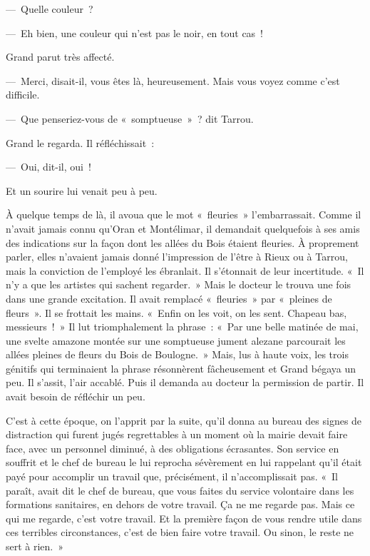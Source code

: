 \documentclass[french,twoside]{book} %
\begin{document}
— Quelle couleur ?\par
— Eh bien, une couleur qui n’est pas le noir, en tout cas !\par
Grand parut très affecté.\par
— Merci, disait-il, vous êtes là, heureusement. Mais vous voyez comme c’est difficile.\par
— Que penseriez-vous de « somptueuse » ? dit Tarrou.\par
Grand le regarda. Il réfléchissait :\par
— Oui, dit-il, oui !\par
Et un sourire lui venait peu à peu.\par
À quelque temps de là, il avoua que le mot « fleuries » l’embarrassait. Comme il n’avait jamais connu qu’Oran et Montélimar, il demandait quelquefois à ses amis des indications sur la façon dont les allées du Bois étaient fleuries. À proprement parler, elles n’avaient jamais donné l’impression de l’être à Rieux ou à Tarrou, mais la conviction de l’employé les ébranlait. Il s’étonnait de leur incertitude. « Il n’y a que les artistes qui sachent regarder. » Mais le docteur le trouva une fois dans une grande excitation. Il avait remplacé « fleuries » par « pleines de fleurs ». Il se frottait les mains. « Enfin on les voit, on les sent. Chapeau bas, messieurs ! » Il lut triomphalement la phrase : « Par une belle matinée de mai, une svelte amazone montée sur une somptueuse jument alezane parcourait les allées pleines de fleurs du Bois de Boulogne. » Mais, lus à haute voix, les trois génitifs qui terminaient la phrase résonnèrent fâcheusement et Grand bégaya un peu. Il s’assit, l’air accablé. Puis il demanda au docteur la permission de partir. Il avait besoin de réfléchir un peu.\par
C’est à cette époque, on l’apprit par la suite, qu’il donna au bureau des signes de distraction qui furent jugés regrettables à un moment où la mairie devait faire face, avec un personnel diminué, à des obligations écrasantes. Son service en souffrit et le chef de bureau le lui reprocha sévèrement en lui rappelant qu’il était payé pour accomplir un travail que, précisément, il n’accomplissait pas. « Il paraît, avait dit le chef de bureau, que vous faites du service volontaire dans les formations sanitaires, en dehors de votre travail. Ça ne me regarde pas. Mais ce qui me regarde, c’est votre travail. Et la première façon de vous rendre utile dans ces terribles circonstances, c’est de bien faire votre travail. Ou sinon, le reste ne sert à rien. »\par
\end{document}
